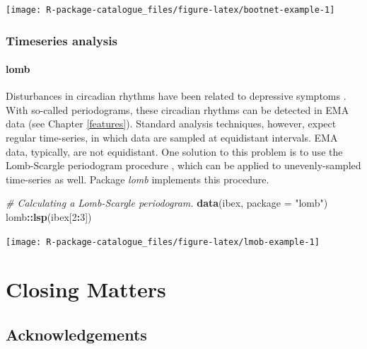 \documentclass[]{book}
\newenvironment{Shaded}{\begin{snugshade}}{\end{snugshade}}
\newcommand{\KeywordTok}[1]{\textcolor[rgb]{0.13,0.29,0.53}{\textbf{#1}}}
\newcommand{\DataTypeTok}[1]{\textcolor[rgb]{0.13,0.29,0.53}{#1}}
\newcommand{\DecValTok}[1]{\textcolor[rgb]{0.00,0.00,0.81}{#1}}
\newcommand{\StringTok}[1]{\textcolor[rgb]{0.31,0.60,0.02}{#1}}
\newcommand{\CommentTok}[1]{\textcolor[rgb]{0.56,0.35,0.01}{\textit{#1}}}
\newcommand{\OperatorTok}[1]{\textcolor[rgb]{0.81,0.36,0.00}{\textbf{#1}}}
\newcommand{\NormalTok}[1]{#1}
\begin{document}
\begin{center}\texttt{[image: R-package-catalogue\_files/figure-latex/bootnet-example-1]} \end{center}

\section{Timeseries analysis}\label{timeseries-analysis}

\subsection{lomb}\label{lomb}

 

Disturbances in circadian rhythms have been related to depressive
symptoms \citep[see, e.g.,][]{Saeb2015}. With so-called periodograms,
these circadian rhythms can be detected in EMA data (see Chapter
\ref{features}). Standard analysis techniques, however, expect regular
time-series, in which data are sampled at equidistant intervals. EMA
data, typically, are not equidistant. One solution to this problem is to
use the Lomb-Scargle periodogram procedure \citep{Lomb1976}, which can
be applied to unevenly-sampled time-series as well. Package \emph{lomb}
\citep{ruf1999} implements this procedure.

\begin{Shaded}
\begin{Highlighting}[]
\CommentTok{# Calculating a Lomb-Scargle periodogram.}
\KeywordTok{data}\NormalTok{(ibex, }\DataTypeTok{package =} \StringTok{"lomb"}\NormalTok{) }
\NormalTok{lomb}\OperatorTok{::}\KeywordTok{lsp}\NormalTok{(ibex[}\DecValTok{2}\OperatorTok{:}\DecValTok{3}\NormalTok{]) }
\end{Highlighting}
\end{Shaded}

\begin{center}\texttt{[image: R-package-catalogue\_files/figure-latex/lmob-example-1]} \end{center}

\part{Closing Matters}\label{part-closing-matters}

\chapter*{Acknowledgements}\label{acknowledgements}
\end{document}
